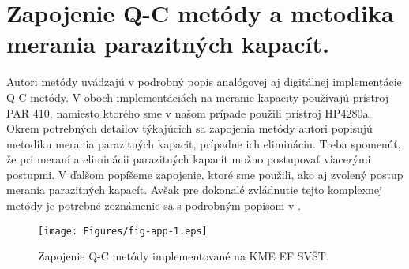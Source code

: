
\chapter{Zapojenie Q-C metódy a metodika merania parazitných kapacít.} %

\label{app:AppendixE} %


Autori metódy uvádzajú v \cite{App.2,App.3,App.4} podrobný popis
analógovej aj digitálnej implementácie Q-C metódy.  V oboch
implementáciách na meranie kapacity používajú prístroj PAR 410,
namiesto ktorého sme v našom prípade použili prístroj HP4280a. Okrem
potrebných detailov týkajúcich sa zapojenia metódy autori popisujú
metodiku merania parazitných kapacit, prípadne ich elimináciu. Treba
spomenúť, že pri meraní a eliminácii parazitných kapacít možno
postupovať viacerými postupmi. V ďalšom popíšeme zapojenie, ktoré sme
použili, ako aj zvolený postup merania parazitných kapacít. Avšak pre
dokonalé zvládnutie tejto komplexnej metódy je potrebné zoznámenie sa
s podrobným popisom v \cite{App.2,App.3,App.4}.

\begin{figure}[h!]\centering
\texttt{[image: Figures/fig-app-1.eps]}
\captionsetup{justification=raggedright, singlelinecheck=false}
\caption[Zapojenie Q-C metódy implementované na KME EF
  SVŠT.]{Zapojenie Q-C metódy implementované na KME EF SVŠT.}
\label{fig:App.1}
\end{figure}

